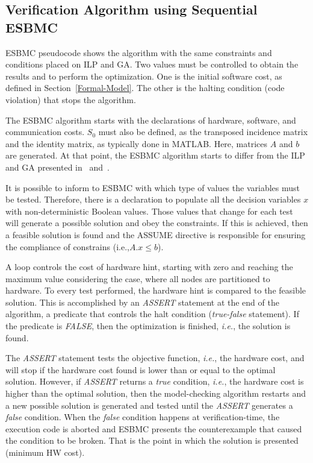 \subsection{Verification Algorithm using Sequential ESBMC}
\label{Verification-Algorithm-using-ESBMC}

ESBMC pseudocode shows the algorithm with the same constraints and conditions placed on ILP and GA. Two values must be controlled to obtain the results and to perform the optimization. One is the initial software cost, as defined in Section~\ref{Formal-Model}. The other is the halting condition (code violation) that stops the algorithm.

The ESBMC algorithm starts with the declarations of hardware, software, and communication costs. $S_0$ must also be defined, as the transposed incidence matrix and the identity matrix, as typically done in MATLAB. Here, matrices $A$ and $b$ are generated. At that point, the ESBMC algorithm starts to differ from the ILP and GA presented in~\cite{Trindade2015} and~\cite{Trindade2014}.

It is possible to inform to ESBMC with which type of values the variables must be tested. Therefore, there is a declaration to populate all the decision variables $x$ with non-deterministic Boolean values. Those values that change for each test will generate a possible solution and obey the constraints. If this is achieved, then a feasible solution is found and the ASSUME directive is responsible for ensuring the compliance of constrains (i.e.,$A.x \leq b$).

A loop controls the cost of hardware hint, starting with zero and reaching the maximum value considering the case, where all nodes are partitioned to hardware. To every test performed, the hardware hint is compared to the feasible solution. This is accomplished by an \textit{ASSERT} statement at the end of the algorithm, a predicate that controls the halt condition (\textit{true-false} statement). If the predicate is \textit{FALSE}, then the optimization is finished, {\it i.e.}, the solution is found. 

The \textit{ASSERT} statement tests the objective function, {\it i.e.}, the hardware cost, and will stop if the hardware cost found is lower than or equal to the optimal solution. However, if \textit{ASSERT} returns a \textit{true} condition, {\it i.e.}, the hardware cost is higher than the optimal solution, then the model-checking algorithm restarts and a new possible solution is generated and tested until the \textit{ASSERT} generates a \textit{false} condition. When the \textit{false} condition happens at verification-time, the execution code is aborted and ESBMC presents the counterexample that caused the condition to be broken. That is the point in which the solution is presented (minimum HW cost).

